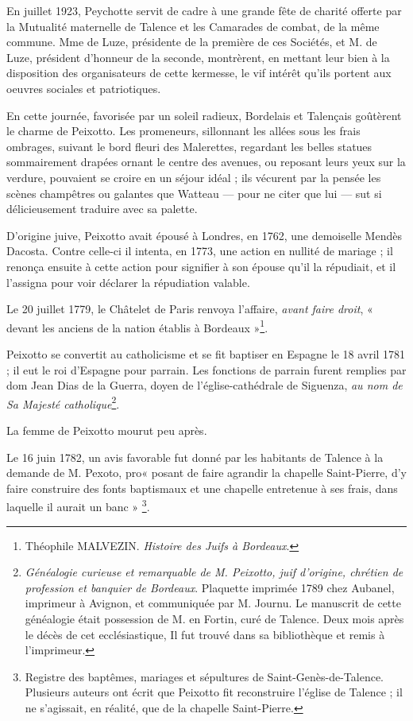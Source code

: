 En juillet 1923, Peychotte servit de cadre à une grande fête de charité offerte par la Mutualité maternelle de Talence et les Camarades de combat, de la même commune. Mme de Luze, présidente de la première de ces Sociétés, et M. de Luze, président d'honneur de la seconde, montrèrent, en mettant leur bien à la disposition des organisateurs de cette kermesse, le vif intérêt qu'ils portent aux oeuvres sociales et patriotiques.

En cette journée, favorisée par un soleil radieux, Bordelais et Talençais goûtèrent le charme de Peixotto. Les promeneurs, sillonnant les allées sous les frais ombrages, suivant le bord fleuri des Malerettes, regardant les belles statues sommairement drapées ornant le centre des avenues, ou reposant leurs yeux sur la verdure, pouvaient se croire en un séjour idéal ; ils vécurent par la pensée les scènes champêtres ou galantes que Watteau — pour ne citer que lui — sut si délicieusement traduire avec sa palette. 

\asterism{}

D'origine juive, Peixotto avait épousé à Londres, en 1762, une demoiselle Mendès Dacosta. Contre celle-ci il intenta, en 1773, une action en nullité de mariage ; il renonça ensuite à cette action pour signifier à son épouse qu'il la répudiait, et il l'assigna pour voir déclarer la répudiation valable.

Le 20 juillet 1779, le Châtelet de Paris renvoya l'affaire, \textit{avant faire droit}, « devant les anciens de la nation établis à Bordeaux »\footnote{Théophile MALVEZIN. \textit{Histoire des Juifs à Bordeaux}.}.

Peixotto se convertit au catholicisme et se fit baptiser en Espagne le 18 avril 1781 ; il eut le roi d'Espagne pour parrain. Les fonctions de parrain furent remplies par dom Jean Dias de la Guerra, doyen de l'église-cathédrale de Siguenza, \textit{au nom de Sa Majesté catholique}\footnote{\textit{Généalogie curieuse et remarquable de M. Peixotto, juif d'origine, chrétien de profession et banquier de Bordeaux}. Plaquette imprimée 1789 chez Aubanel, imprimeur à Avignon, et communiquée par M. Journu. Le manuscrit de cette généalogie était possession de M. en Fortin, curé de Talence. Deux mois après le décès de cet ecclésiastique, Il fut trouvé dans sa bibliothèque et remis à l'imprimeur.}.

La femme de Peixotto mourut peu après.

Le 16 juin 1782, un avis favorable fut donné par les habitants de Talence à la demande de M. Pexoto, pro« posant de faire agrandir la chapelle Saint-Pierre, d'y faire construire des fonts baptismaux et une chapelle entretenue à ses frais, dans laquelle il aurait un banc » \footnote{Registre des baptêmes, mariages et sépultures de Saint-Genès-de-Talence.\\Plusieurs auteurs ont écrit que Peixotto fit reconstruire l'église de Talence ; il ne s'agissait, en réalité, que de la chapelle Saint-Pierre.}.

